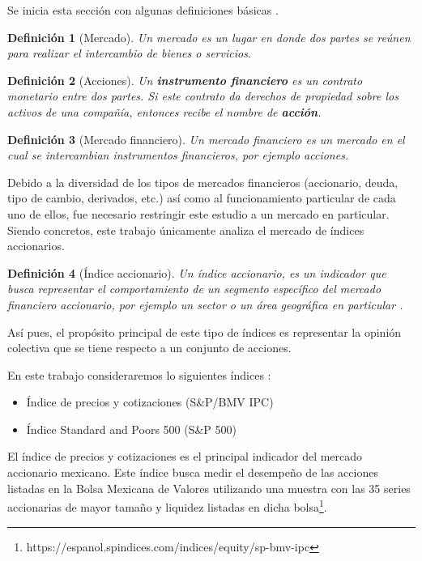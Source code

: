 \documentclass[12pt]{report}
\theoremstyle{break}
\newtheorem{definicion}{Definición}[chapter]
\theoremstyle{break}
\begin{document}
Se inicia esta sección con algunas definiciones básicas \cite{CFA2019-market-org}.

\begin{definicion}[Mercado]
\label{definicion:mercado}
Un mercado es un lugar en donde dos partes se reúnen para realizar el intercambio de bienes o servicios.
\end{definicion}

\begin{definicion}[Acciones]
\label{definicion:instrumento-financiero}
Un \textbf{instrumento financiero} es un contrato monetario entre dos partes. Si este contrato da derechos de propiedad sobre los activos de una compañía, entonces recibe el nombre de \textbf{acción}.
\end{definicion}

\begin{definicion}[Mercado financiero]
\label{definicion:mercado-financiero}
Un mercado financiero es un mercado en el cual se intercambian instrumentos financieros, por ejemplo acciones.
\end{definicion}

Debido a la diversidad de los tipos de mercados financieros (accionario, deuda, tipo de cambio, derivados, etc.) así como al funcionamiento particular de cada uno de ellos, fue necesario restringir este estudio a un mercado en particular. Siendo concretos, este trabajo únicamente analiza el mercado de índices accionarios.

\begin{definicion}[Índice accionario]
\label{definicion:indice-accionario}
Un índice accionario, es un indicador que busca representar el comportamiento de un segmento específico del mercado financiero accionario, por ejemplo un sector o un área geográfica en particular \cite{CFA2019-market-index}.
\end{definicion}

Así pues, el propósito principal de este tipo de índices es representar la opinión colectiva que se tiene respecto a un conjunto de acciones.

En este trabajo consideraremos lo siguientes índices :

\begin{itemize}
\item Índice de precios y cotizaciones (S\&P/BMV IPC)
\item Índice Standard and Poors 500 (S\&P 500)
\end{itemize}

El índice de precios y cotizaciones es el principal indicador del mercado accionario mexicano. Este índice busca medir el desempeño de las acciones listadas en la Bolsa Mexicana de Valores utilizando una muestra con las 35 series accionarias de mayor tamaño y liquidez listadas en dicha bolsa\footnote{https://espanol.spindices.com/indices/equity/sp-bmv-ipc}.
\end{document}
